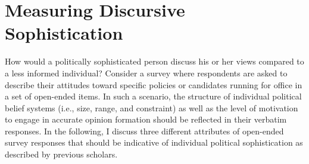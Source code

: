 \documentclass[12pt]{article}
\begin{document}
\section*{Measuring Discursive Sophistication}



How would a politically sophisticated person discuss his or her views compared to a less informed individual? Consider a survey where respondents are asked to describe their attitudes toward specific policies or candidates running for office in a set of open-ended items. In such a scenario, the structure of individual political belief systems (i.e., size, range, and constraint) as well as the level of motivation to engage in accurate opinion formation should be reflected in their verbatim responses. In the following, I discuss three different attributes of open-ended survey responses that should be indicative of individual political sophistication as described by previous scholars.
\end{document}
